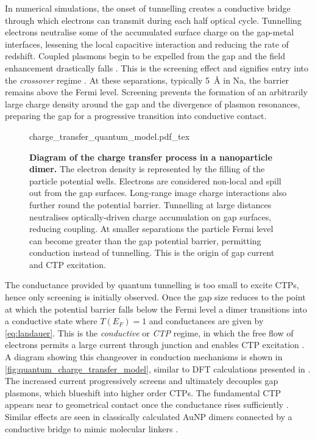 \documentclass{article}
\begin{document}
In numerical simulations, the onset of tunnelling creates a conductive bridge through which electrons can transmit during each half optical cycle. Tunnelling electrons neutralise some of the accumulated surface charge on the gap-metal interfaces, lessening the local capacitive interaction and reducing the rate of redshift. Coupled plasmons begin to be expelled from the gap and the field enhancement drastically falls \cite{zuloaga2009, esteban2012}. This is the screening effect and signifies entry into the \emph{crossover} regime \cite{zuloaga2009}. At these separations, typically \SI{5}{\angstrom} in Na, the barrier remains above the Fermi level. Screening prevents the formation of an arbitrarily large charge density around the gap and the divergence of plasmon resonances, preparing the gap for a progressive transition into conductive contact.

\begin{figure}[bt]
\vspace{-5pt}
\def\svgwidth{0.9\textwidth}
\fontsize{10pt}{1em}\selectfont
{charge_transfer_quantum_model.pdf_tex}
\caption[Diagram of the charge transfer process in a nanoparticle dimer]{\textbf{Diagram of the charge transfer process in a nanoparticle dimer.} The electron density is represented by the filling of the particle potential wells. Electrons are considered non-local and spill out from the gap surfaces. Long-range image charge interactions also further round the potential barrier. Tunnelling at large distances neutralises optically-driven charge accumulation on gap surfaces, reducing coupling. At smaller separations the particle Fermi level can become greater than the gap potential barrier, permitting conduction instead of tunnelling. This is the origin of gap current and CTP excitation.}
\label{fig:quantum_charge_transfer_model}
\vspace{-15pt}
\end{figure}

The conductance provided by quantum tunnelling is too small to excite CTPs, hence only screening is initially observed. Once the gap size reduces to the point at which the potential barrier falls below the Fermi level a dimer transitions into a conductive state where $T(E_F)=1$ and conductances are given by \eqref{eq:landauer}. This is the \emph{conductive} or \emph{CTP} regime, in which the free flow of electrons permits a large current through junction and enables CTP excitation \cite{zuloaga2009}. A diagram showing this changeover in conduction mechanisms is shown in \autoref{fig:quantum_charge_transfer_model}, similar to DFT calculations presented in \cite{zuloaga2009}. The increased current progressively screens and ultimately decouples gap plasmons, which blueshift into higher order CTPs. The fundamental CTP appears near to geometrical contact once the conductance rises sufficiently \cite{esteban2012, scholl2013}. Similar effects are seen in classically calculated AuNP dimers connected by a conductive bridge to mimic molecular linkers \cite{perez2010, perez2011}.
\end{document}
